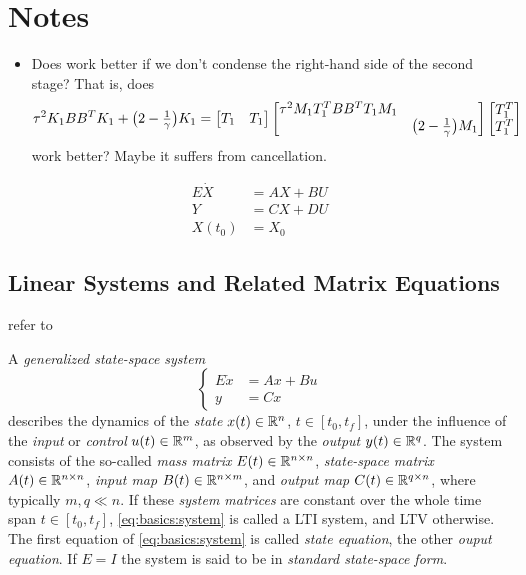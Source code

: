 \chapter{Notes}

\begin{itemize}
  \item
    Does  work better if we don't condense the right-hand side of the second stage?
    That is, does
    \begin{equation}
      \tau^2 K_1 BB^T K_1 + \big( 2-\tfrac{1}{\gamma} \big) K_1
      = \begin{bmatrix}
        T_1 & T_1
      \end{bmatrix}
      \begin{bmatrix}
        \tau^2 M_1 T_1^T BB^T T_1 M_1 \\
        &\big( 2-\tfrac{1}{\gamma} \big) M_1
      \end{bmatrix}
      \begin{bmatrix}
        T_1^T \\
        T_1^T
      \end{bmatrix}
    \end{equation}
    work better?
    Maybe it suffers from cancellation.
\end{itemize}

\begin{align}
  E\dot{X} &= AX + BU \\
  Y &= CX + DU \\
  X(t_0) &= X_0
\end{align}

\section{Linear Systems and Related Matrix Equations}

refer to \cite{Simoncini2016}

A \emph{generalized state-space system}
\begin{equation}
\label{eq:basics:system}
\left\{
\begin{aligned}
  E \dot x &= Ax + Bu\\
  y &= Cx
\end{aligned}
\right.
\end{equation}
describes the dynamics of the \emph{state} $x(t) \in\mathbb{R}^n$, $t\in [t_0, t_f]$,
under the influence of the \emph{input} or \emph{control} $u(t)\in\mathbb{R}^m$,
as observed by the \emph{output} $y(t) \in\mathbb{R}^q$.
The system consists of the so-called
\emph{mass matrix} $E(t) \in\mathbb{R}^{n\times n}$,
\emph{state-space matrix} $A(t) \in\mathbb{R}^{n\times n}$,
\emph{input map} $B(t) \in\mathbb{R}^{n\times m}$, and
\emph{output map} $C(t) \in\mathbb{R}^{q\times n}$,
where typically $m,q \ll n$.
If these \emph{system matrices} are constant over the whole time span $t \in [t_0, t_f]$,
\eqref{eq:basics:system} is called a \ac{LTI} system, and \ac{LTV} otherwise.
The first equation of \eqref{eq:basics:system} is called \emph{state equation},
the other \emph{ouput equation}.
If $E=I$ the system is said to be in \emph{standard state-space form}.

